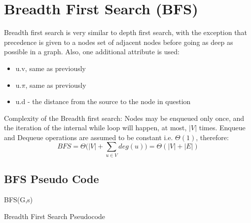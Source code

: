 \documentclass[12pt,letterpaper]{article}
\begin{document}
\section{Breadth First Search (BFS)}
Breadth first search is very similar to depth first search, with the exception that precedence is given to a nodes set of adjacent nodes before going as deep as possible in a graph. Also, one additional attribute is used:
\begin{itemize}
\item u.v, same as previously
\item u.$\pi$, same as previously
\item u.d - the distance from the source to the node in question
\end{itemize}  
Complexity of the Breadth first search: Nodes may be enqueued only once, and the iteration of the internal while loop will happen, at most, $|V|$ times. Enqueue and Dequeue operations are assumed to be constant i.e. $\Theta(1)$, therefore:
\[BFS=\Theta(|V|+\sum_{u\in V}{deg(u))}=\Theta(|V|+|E|)\]
\subsection{BFS Pseudo Code}
\begin{algorithm}
BFS(G,s)
\caption{Breadth First Search Pseudocode}
\end{algorithm}
\FloatBarrier
\end{document}

